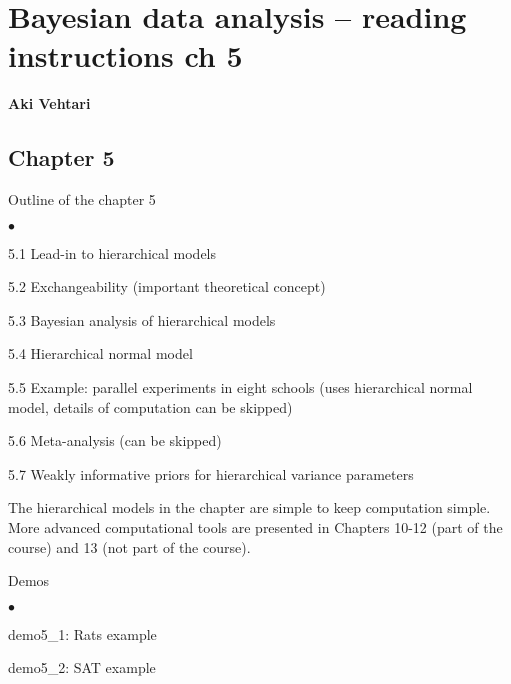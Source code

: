 \documentclass[a4paper,11pt,english]{article}
\begin{document}
\thispagestyle{empty}

\section*{Bayesian data analysis -- reading instructions ch 5} 
\smallskip
{\bf Aki Vehtari}
\smallskip

\subsection*{Chapter 5}

Outline of the chapter 5
\begin{list}{$\bullet$}{\parsep=0pt\itemsep=2pt}
\item 5.1 Lead-in to hierarchical models
\item 5.2 Exchangeability (important theoretical concept)
\item 5.3 Bayesian analysis of hierarchical models
\item 5.4 Hierarchical normal model
\item 5.5 Example: parallel experiments in eight schools (uses hierarchical normal model, details of computation can be skipped)
\item 5.6 Meta-analysis (can be skipped)
\item 5.7 Weakly informative priors for hierarchical variance parameters
\end{list}

The hierarchical models in the chapter are simple to keep computation
simple. More advanced computational tools are presented in Chapters
10-12 (part of the course) and 13 (not part of the course).

Demos
\begin{list}{$\bullet$}{\parsep=0pt\itemsep=2pt}
\item demo5\_1: Rats example
\item demo5\_2: SAT example
\end{list}
\end{document}
